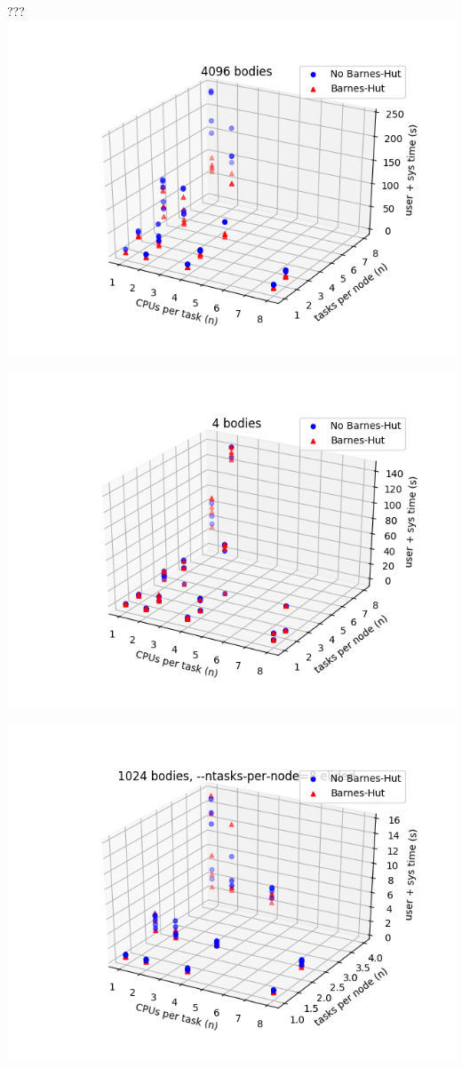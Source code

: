 \documentclass{beamer}
\begin{document}
\begin{frame}[allowframebreaks]{???}
\includegraphics[width=\linewidth]{4096-cpusPerTask-tasksPerNode}

\framebreak

\includegraphics[width=\linewidth]{4-cpusPerTask-tasksPerNode}

\framebreak

\includegraphics[width=\linewidth]{1024-cpusPerTask-tasksPerNode-elide_8_tpn}


\end{frame}
\end{document}
